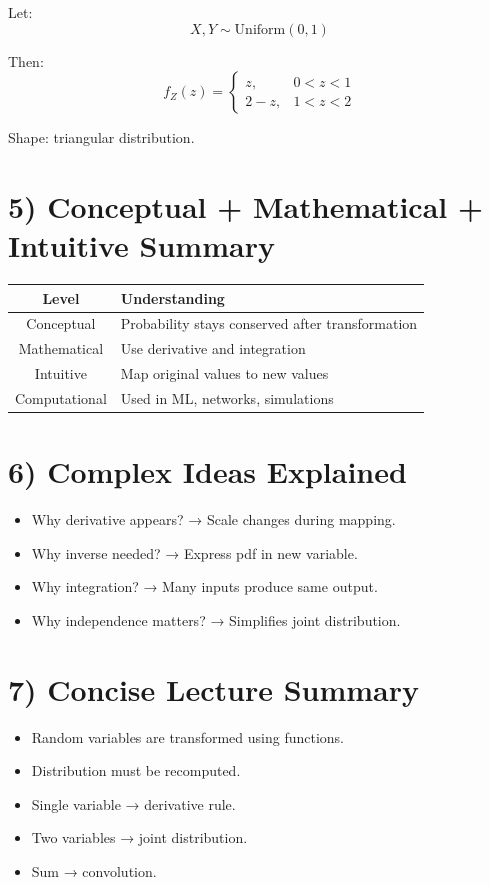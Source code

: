 \documentclass[12pt,a4paper]{article}
\begin{document}
Let:
\[
X,Y \sim \text{Uniform}(0,1)
\]

Then:
\[
f_Z(z)=
\begin{cases}
z, & 0<z<1 \\
2-z, & 1<z<2
\end{cases}
\]

Shape: triangular distribution.

\section*{5) Conceptual + Mathematical + Intuitive Summary}

\begin{center}
\begin{tabular}{|c|p{8cm}|}
\hline
Level & Understanding \\
\hline
Conceptual & Probability stays conserved after transformation \\
Mathematical & Use derivative and integration \\
Intuitive & Map original values to new values \\
Computational & Used in ML, networks, simulations \\
\hline
\end{tabular}
\end{center}

\section*{6) Complex Ideas Explained}

\begin{itemize}
\item Why derivative appears? → Scale changes during mapping.
\item Why inverse needed? → Express pdf in new variable.
\item Why integration? → Many inputs produce same output.
\item Why independence matters? → Simplifies joint distribution.
\end{itemize}

\section*{7) Concise Lecture Summary}

\begin{itemize}
\item Random variables are transformed using functions.
\item Distribution must be recomputed.
\item Single variable → derivative rule.
\item Two variables → joint distribution.
\item Sum → convolution.
\end{itemize}
\end{document}
